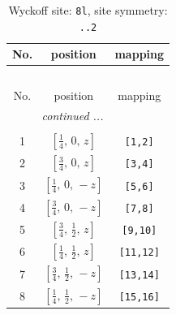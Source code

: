 \documentclass[fleqn,8pt]{jsarticle}
\begin{document}
\begin{longtable}{ccc}
\caption{Wyckoff site: {\tt 8l}, site symmetry: {\tt ..2}}
 \\
 \hline \hline
No. & position & mapping \\ \hline \endfirsthead

\multicolumn{2}{l}{\tablename\ \thetable{}} \\
 \hline \hline
No. & position & mapping \\ \hline \endhead

 \hline \hline
\multicolumn{2}{r}{\footnotesize\it continued ...} \\ \endfoot

 \hline \hline
\multicolumn{2}{r}{} \\ \endlastfoot

1 & $\left[ \frac{1}{4},\, 0,\, z \right]$ & {\tt [1,2]} \\ \hline
2 & $\left[ \frac{3}{4},\, 0,\, z \right]$ & {\tt [3,4]} \\ \hline
3 & $\left[ \frac{1}{4},\, 0,\, - z \right]$ & {\tt [5,6]} \\ \hline
4 & $\left[ \frac{3}{4},\, 0,\, - z \right]$ & {\tt [7,8]} \\ \hline
5 & $\left[ \frac{3}{4},\, \frac{1}{2},\, z \right]$ & {\tt [9,10]} \\ \hline
6 & $\left[ \frac{1}{4},\, \frac{1}{2},\, z \right]$ & {\tt [11,12]} \\ \hline
7 & $\left[ \frac{3}{4},\, \frac{1}{2},\, - z \right]$ & {\tt [13,14]} \\ \hline
8 & $\left[ \frac{1}{4},\, \frac{1}{2},\, - z \right]$ & {\tt [15,16]} \\
\end{longtable}
\renewcommand{\arraystretch}{1.2}
\end{document}
